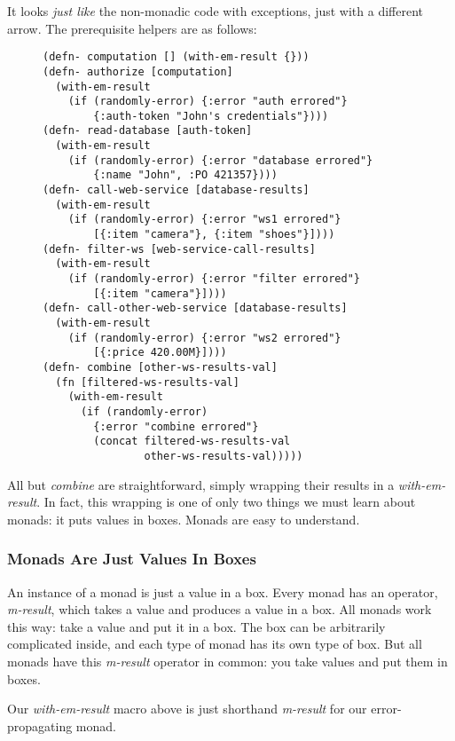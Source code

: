 \documentclass[11pt]{article}
\begin{document}
It looks \emph{just like} the non-monadic code with exceptions, just
with a different arrow. The prerequisite helpers are as follows:

\begin{figure}[H]
\label{monadic-helpers}
\begin{verbatim}
(defn- computation [] (with-em-result {}))
(defn- authorize [computation]
  (with-em-result
    (if (randomly-error) {:error "auth errored"}
        {:auth-token "John's credentials"})))
(defn- read-database [auth-token]
  (with-em-result
    (if (randomly-error) {:error "database errored"}
        {:name "John", :PO 421357})))
(defn- call-web-service [database-results]
  (with-em-result
    (if (randomly-error) {:error "ws1 errored"}
        [{:item "camera"}, {:item "shoes"}])))
(defn- filter-ws [web-service-call-results]
  (with-em-result
    (if (randomly-error) {:error "filter errored"}
        [{:item "camera"}])))
(defn- call-other-web-service [database-results]
  (with-em-result
    (if (randomly-error) {:error "ws2 errored"}
        [{:price 420.00M}])))
(defn- combine [other-ws-results-val]
  (fn [filtered-ws-results-val]
    (with-em-result
      (if (randomly-error)
        {:error "combine errored"}
        (concat filtered-ws-results-val
                other-ws-results-val)))))
\end{verbatim}
\end{figure}

All but \emph{combine} are straightforward, simply wrapping their
results in a \emph{with-em-result}. In fact, this wrapping is one of
only two things we must learn about monads: it puts values in
boxes. Monads are easy to understand.

\subsubsection{Monads Are Just Values In Boxes}
\label{sec-3-2-1}

An instance of a monad is just a value in a box. Every monad has an
operator, \emph{m-result}, which takes a value and produces a value in a
box. All monads work this way: take a value and put it in a box.
The box can be arbitrarily complicated inside, and each type of
monad has its own type of box. But all monads have this \emph{m-result}
operator in common: you take values and put them in boxes. 

Our \emph{with-em-result} macro above is just shorthand \emph{m-result} for
our error-propagating monad.
\end{document}
